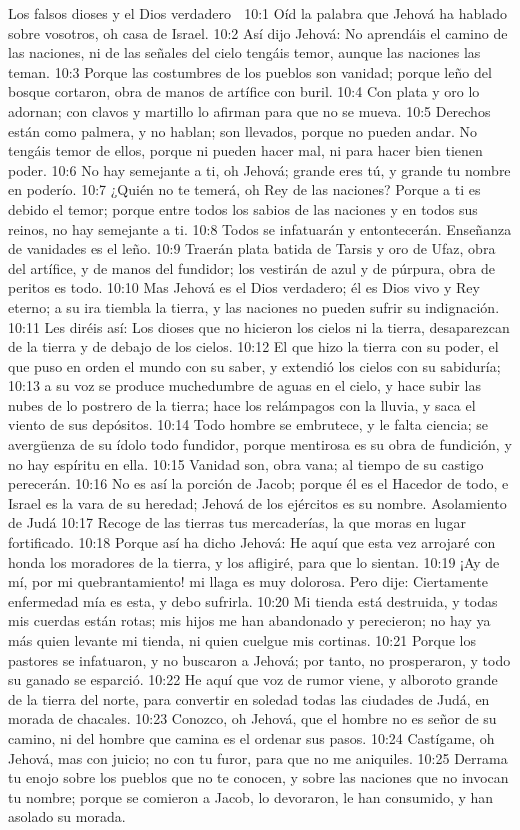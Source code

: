 Los falsos dioses y el Dios verdadero  

10:1 Oíd la palabra que Jehová ha hablado sobre vosotros, oh casa de Israel.  
10:2 Así dijo Jehová: No aprendáis el camino de las naciones, ni de las señales del cielo tengáis temor, aunque las naciones las teman.  
10:3 Porque las costumbres de los pueblos son vanidad; porque leño del bosque cortaron, obra de manos de artífice con buril.  
10:4 Con plata y oro lo adornan; con clavos y martillo lo afirman para que no se mueva.  
10:5 Derechos están como palmera, y no hablan; son llevados, porque no pueden andar. No tengáis temor de ellos, porque ni pueden hacer mal, ni para hacer bien tienen poder.  
10:6 No hay semejante a ti, oh Jehová; grande eres tú, y grande tu nombre en poderío.  
10:7 ¿Quién no te temerá, oh Rey de las naciones? Porque a ti es debido el temor; porque entre todos los sabios de las naciones y en todos sus reinos, no hay semejante a ti.  
10:8 Todos se infatuarán y entontecerán. Enseñanza de vanidades es el leño.  
10:9 Traerán plata batida de Tarsis y oro de Ufaz, obra del artífice, y de manos del fundidor; los vestirán de azul y de púrpura, obra de peritos es todo.  
10:10 Mas Jehová es el Dios verdadero; él es Dios vivo y Rey eterno; a su ira tiembla la tierra, y las naciones no pueden sufrir su indignación.  
10:11 Les diréis así: Los dioses que no hicieron los cielos ni la tierra, desaparezcan de la tierra y de debajo de los cielos.  
10:12 El que hizo la tierra con su poder, el que puso en orden el mundo con su saber, y extendió los cielos con su sabiduría;  
10:13 a su voz se produce muchedumbre de aguas en el cielo, y hace subir las nubes de lo postrero de la tierra; hace los relámpagos con la lluvia, y saca el viento de sus depósitos.  
10:14 Todo hombre se embrutece, y le falta ciencia; se avergüenza de su ídolo todo fundidor, porque mentirosa es su obra de fundición, y no hay espíritu en ella.  
10:15 Vanidad son, obra vana; al tiempo de su castigo perecerán.  
10:16 No es así la porción de Jacob; porque él es el Hacedor de todo, e Israel es la vara de su heredad; Jehová de los ejércitos es su nombre.  
Asolamiento de Judá  
10:17 Recoge de las tierras tus mercaderías, la que moras en lugar fortificado.  
10:18 Porque así ha dicho Jehová: He aquí que esta vez arrojaré con honda los moradores de la tierra, y los afligiré, para que lo sientan.  
10:19 ¡Ay de mí, por mi quebrantamiento! mi llaga es muy dolorosa. Pero dije: Ciertamente enfermedad mía es esta, y debo sufrirla.  
10:20 Mi tienda está destruida, y todas mis cuerdas están rotas; mis hijos me han abandonado y perecieron; no hay ya más quien levante mi tienda, ni quien cuelgue mis cortinas.  
10:21 Porque los pastores se infatuaron, y no buscaron a Jehová; por tanto, no prosperaron, y todo su ganado se esparció.  
10:22 He aquí que voz de rumor viene, y alboroto grande de la tierra del norte, para convertir en soledad todas las ciudades de Judá, en morada de chacales.  
10:23 Conozco, oh Jehová, que el hombre no es señor de su camino, ni del hombre que camina es el ordenar sus pasos.  
10:24 Castígame, oh Jehová, mas con juicio; no con tu furor, para que no me aniquiles.  
10:25 Derrama tu enojo sobre los pueblos que no te conocen, y sobre las naciones que no invocan tu nombre; porque se comieron a Jacob, lo devoraron, le han consumido, y han asolado su morada.  

